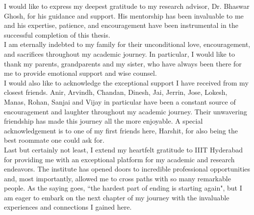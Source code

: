 I would like to express my deepest gratitude to my research advisor, Dr. Bhaswar Ghosh, for his 
guidance and support. His mentorship has been invaluable to me and his expertise, patience, and 
encouragement have been instrumental in the successful completion of this thesis. \\

I am eternally indebted to my family for their unconditional love, encouragement, and sacrifices 
throughout my academic journey. In particular, I would like to thank my parents, grandparents and my sister, 
who have always been there for me to provide emotional support and wise counsel. \\

I would also like to acknowledge the exceptional support I have received from my closest friends. 
Anir, Arvindh, Chandan, Dinesh, Jai, Jerrin, Jose, Lokesh, Manas, Rohan, Sanjai and Vijay in particular
have been a constant source of encouragement and laughter throughout my academic journey. 
Their unwavering friendship has made this journey all the more enjoyable. A special acknowledgement is to 
one of my first friends here, Harshit, for also being the best roommate one could ask for. \\

Last but certainly not least, I extend my heartfelt gratitude to IIIT Hyderabad for providing me with an 
exceptional platform for my academic and research endeavors. The institute has opened doors to incredible 
professional opportunities and, most importantly, allowed me to cross paths with so many remarkable people. 
As the saying goes, ``the hardest part of ending is starting again", but I am eager to embark on the next 
chapter of my journey with the invaluable experiences and connections I gained here.
